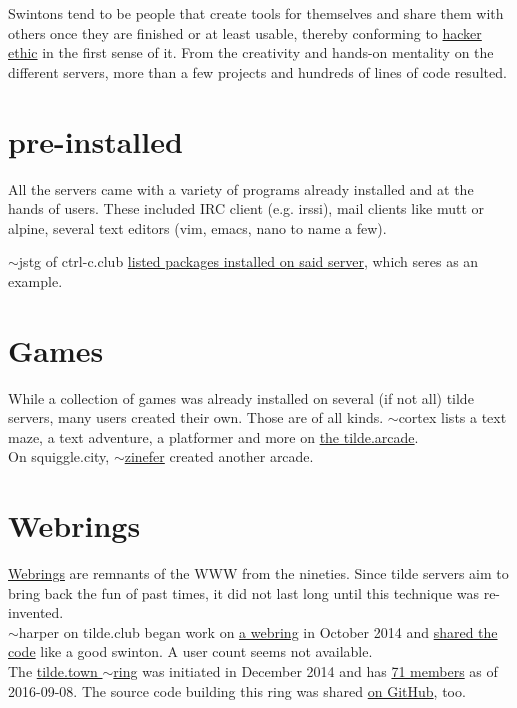 Swintons tend to be people that create tools for themselves and share them with others once they are finished or at least usable, thereby conforming to \href{http://www.catb.org/jargon/html/H/hacker-ethic.html}{hacker ethic} in the first sense of it. From the creativity and hands-on mentality on the different servers, more than a few projects and hundreds of lines of code resulted.

\section{pre-installed}
All the servers came with a variety of programs already installed and at the hands of users. These included IRC client (e.g. irssi), mail clients like mutt or alpine, several text editors (vim, emacs, nano to name a few).

$\sim$jstg of ctrl-c.club \href{http://ctrl-c.club/~jstg/available_programs.html}{listed packages installed on said server}, which seres as an example.

\section{Games}
While a collection of games was already installed on several (if not all) tilde servers, many users created their own. Those are of all kinds. $\sim$cortex lists a text maze, a text adventure, a platformer and more on \href{http://www.tilde.club/~cortex/games.html}{the tilde.arcade}.\\

On squiggle.city, \href{https://squiggle.city/~zinefer/}{$\sim$zinefer} created another arcade.

\section{Webrings}
\href{https://en.wikipedia.org/wiki/Webring}{Webrings} are remnants of the WWW from the nineties. Since tilde servers aim to bring back the fun of past times, it did not last long until this technique was re-invented.
\\

$\sim$harper on tilde.club began work on \href{http://tilde.club/~harper/join.html}{a webring} in October 2014 and \href{https://github.com/harperreed/harper.tilde/}{shared the code} like a good swinton. A user count seems not available.
\\

The \href{http://tilde.town/~um/tilde_ring/join.html}{tilde.town $\sim$ring} was initiated in December 2014 and has \href{http://tilde.town/~um/tilde_ring/members.html}{71 members} as of 2016-09-08. The source code building this ring was shared \href{https://github.com/jamesandariese/tilde.town.webring}{on GitHub}, too.
\\

